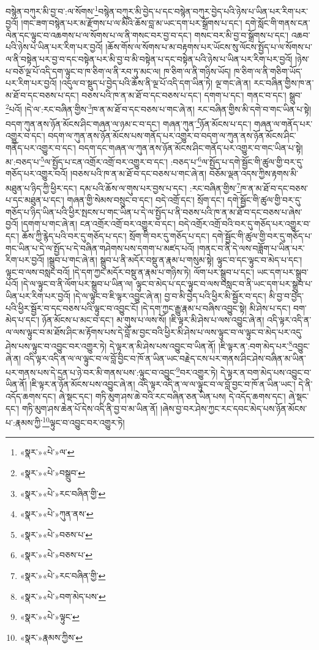 བསྙེན་བཀུར་མི་བྱ་བ་:ལ་སོགས་\footnote{«སྣར་»«པེ་»ལ་}བསྙེན་བཀུར་མི་བྱེད་པ་དང་བསྙེན་བཀུར་བྱེད་པའི་ཉེས་པ་ཡིན་པར་རིག་པར་བྱའོ། །གང་ཟག་བསྙེན་པར་མ་རྫོགས་པ་ལ་མིའི་ཆོས་བླ་མ་ཡང་དག་པར་སྒྲོགས་པ་དང་། དགེ་སློང་གི་གནས་ངན་ལེན་དང་ལྟུང་བ་འཆགས་པ་ལ་སོགས་པ་ལ་ནི་གསང་བར་བྱ་བ་དང་། གསང་བར་མི་བྱ་བ་སྒྲོགས་པ་དང་། འཆབ་པའི་ཉེས་པ་ཡིན་པར་རིག་པར་བྱའོ། །ཆོས་གོས་ལ་སོགས་པ་མ་བརྟགས་པར་ཡོངས་སུ་ལོངས་སྤྱོད་པ་ལ་སོགས་པ་ལ་ནི་བསྟེན་པར་བྱ་བ་དང་བསྟེན་པར་མི་བྱ་བ་མི་བསྟེན་པ་དང་བསྟེན་པའི་ཉེས་པ་ཡིན་པར་རིག་པར་བྱའོ། །ཉེས་པ་བཅོ་ལྔ་པོ་འདི་དག་ལྟུང་བ་ཁ་ཅིག་ལ་ནི་རབ་ཏུ་མང་ལ། ཁ་ཅིག་ལ་ནི་གཉིས་ཡོད། ཁ་ཅིག་ལ་ནི་གཅིག་ཡོད་པར་རིག་པར་བྱའོ། །འདུལ་བ་སྡུད་པ་བྱེད་པའི་ཆོས་ནི་ལྔ་པོ་འདི་དག་ཡིན་ཏེ། ལྔ་གང་ཞེ་ན། རང་བཞིན་གྱིས་ཁ་ན་མ་ཐོ་བ་དང་བཅས་པ་དང་། བཅས་པའི་ཁ་ན་མ་ཐོ་བ་དང་བཅས་པ་དང་། དགག་པ་དང་། གནང་བ་དང་། སྒྲུབ་\footnote{«སྣར་»«པེ་»བསྒྲུབ་}པའོ། །དེ་ལ་:རང་བཞིན་གྱིས་\footnote{«སྣར་»«པེ་»རང་བཞིན་གྱི་}ཁ་ན་མ་ཐོ་བ་དང་བཅས་པ་གང་ཞེ་ན། རང་བཞིན་གྱིས་མི་དགེ་བ་གང་ཡིན་པ་སྟེ། བདག་ཀུན་ནས་ཉོན་མོངས་ཤིང་གཞན་ལ་ཉམ་ང་བ་དང་། གཞན་ཀུན་\footnote{«སྣར་»«པེ་»ཀུན་ནས་}ཉོན་མོངས་པ་དང་། གཞན་ལ་གནོད་པར་འགྱུར་བ་དང་། བདག་ལ་ཀུན་ནས་ཉོན་མོངས་པས་གནོད་པར་འགྱུར་བ་བདག་ལ་ཀུན་ནས་ཉོན་མོངས་ཤིང་གནོད་པར་འགྱུར་བ་དང་། བདག་དང་གཞན་ལ་ཀུན་ནས་ཉོན་མོངས་ཤིང་གནོད་པར་འགྱུར་བ་གང་ཡིན་པ་སྟེ། མ་:བཅད་པ་\footnote{«སྣར་»«པེ་»བཅས་པ་}ལ་སྤྱོད་པ་ངན་འགྲོར་འགྲོ་བར་འགྱུར་བ་དང་། :བཅད་པ་\footnote{«སྣར་»«པེ་»བཅས་པ་}ལ་སྤྱོད་པ་དགེ་སྦྱོང་གི་ཚུལ་གྱི་བར་དུ་གཅོད་པར་འགྱུར་བའོ། །བཅས་པའི་ཁ་ན་མ་ཐོ་བ་དང་བཅས་པ་གང་ཞེ་ན། བཅོམ་ལྡན་འདས་ཀྱིས་རྟགས་མི་མཐུན་པ་ཉིད་ཀྱི་ཕྱིར་དང་། དམ་པའི་ཆོས་ལ་གུས་པར་བྱས་པ་དང་། :རང་བཞིན་གྱིས་\footnote{«སྣར་»«པེ་»རང་བཞིན་གྱི་}ཁ་ན་མ་ཐོ་བ་དང་བཅས་པ་དང་མཐུན་པ་དང་། གཞན་གྱི་སེམས་བསྲུང་བ་དང་། བདེ་འགྲོ་དང་། སྲོག་དང་། དགེ་སྦྱོང་གི་ཚུལ་གྱི་བར་དུ་གཅོད་པ་ཉིད་ཡིན་པའི་ཕྱིར་སྤངས་པ་གང་ཡིན་པ་དེ་ལ་སྤྱོད་པ་ནི་བཅས་པའི་ཁ་ན་མ་ཐོ་བ་དང་བཅས་པ་ཞེས་བྱའོ། །དགག་པ་གང་ཞེ་ན། ངན་འགྲོར་འགྲོ་བར་འགྱུར་བ་དང་། བདེ་འགྲོར་འགྲོ་བའི་བར་དུ་གཅོད་པར་འགྱུར་བ་དང་། ཆོས་ཀྱི་རྙེད་པའི་བར་དུ་གཅོད་པ་དང་། སྲོག་གི་བར་དུ་གཅོད་པ་དང་། དགེ་སྦྱོང་གི་ཚུལ་གྱི་བར་དུ་གཅོད་པ་གང་ཡིན་པ་དེ་ལ་སྤྱོད་པ་དེ་བཞིན་གཤེགས་པས་དགག་པ་མཛད་པའོ། །གནང་བ་ནི་དེ་ལས་བཟློག་པ་ཡིན་པར་རིག་པར་བྱའོ། །སྒྲུབ་པ་གང་ཞེ་ན། སྒྲུབ་པ་ནི་མདོར་བསྡུ་ན་རྣམ་པ་གསུམ་སྟེ། ལྟུང་བ་དང་ལྟུང་བ་མེད་པ་དང་། ལྟུང་བ་ལས་བསླང་བའོ། །དེ་དག་ཀྱང་མདོར་བསྡུ་ན་རྣམ་པ་གཉིས་ཏེ། ལོག་པར་སྒྲུབ་པ་དང་། ཡང་དག་པར་སྒྲུབ་པའོ། །དེ་ལ་ལྟུང་བ་ནི་ལོག་པར་སྒྲུབ་པ་ཡིན་ལ། ལྟུང་བ་མེད་པ་དང་ལྟུང་བ་ལས་བསླང་བ་ནི་ཡང་དག་པར་སྒྲུབ་པ་ཡིན་པར་རིག་པར་བྱའོ། །དེ་ལ་ལྟུང་བ་ཇི་ལྟར་འབྱུང་ཞེ་ན། བྱ་བ་མི་བྱེད་པའི་ཕྱིར་མི་སྦྱོར་བ་དང་། མི་བྱ་བ་བྱེད་པའི་ཕྱིར་སྦྱོར་བ་དང་བཅས་པའི་ལྟུང་བ་འབྱུང་ངོ། །དེ་དག་ཀྱང་རྒྱུ་རྣམ་པ་བཞིས་འབྱུང་སྟེ། མི་ཤེས་པ་དང་། བག་མེད་པ་དང་། ཉོན་མོངས་པ་མང་བ་དང་། མ་གུས་པ་ལས་སོ། །ཇི་ལྟར་མི་ཤེས་པ་ལས་འབྱུང་ཞེ་ན། འདི་ལྟར་འདི་ན་ལ་ལས་ལྟུང་བ་མ་ཐོས་ཤིང་མ་རྟོགས་པས་དེ་བློ་མ་བྱང་བའི་ཕྱིར་མི་ཤེས་པ་ལས་ལྟུང་བ་ལ་ལྟུང་བ་མེད་པར་འདུ་ཤེས་པས་ལྟུང་བ་འབྱུང་བར་འགྱུར་ཏེ། དེ་ལྟར་ན་མི་ཤེས་པས་འབྱུང་བ་ཡིན་ནོ། །ཇི་ལྟར་ན་:བག་མེད་པར་\footnote{«སྣར་»«པེ་»བག་མེད་པས་}འབྱུང་ཞེ་ན། འདི་ལྟར་འདི་ན་ལ་ལ་ལྟུང་བ་ལ་བློ་བྱིང་བ་ཁོ་ན་ཡིན་ཡང་བརྗེད་ངས་པར་གནས་ཤིང་ཤེས་བཞིན་མ་ཡིན་པར་གནས་པས་དེ་དྲན་པ་ཉེ་བར་མི་གནས་པས་:ལྟུང་བ་འབྱུང་\footnote{«སྣར་»«པེ་»ལྟུང་}བར་འགྱུར་ཏེ། དེ་ལྟར་ན་བག་མེད་པས་འབྱུང་བ་ཡིན་ནོ། །ཇི་ལྟར་ན་ཉོན་མོངས་པས་འབྱུང་ཞེ་ན། འདི་ལྟར་འདི་ན་ལ་ལ་ལྟུང་བ་ལ་བློ་བྱང་བ་ཁོ་ན་ཡིན་ཡང་། དེ་ནི་འདོད་ཆགས་དང་། ཞེ་སྡང་དང་། གཏི་མུག་ཤས་ཆེ་བའི་རང་བཞིན་ཅན་ཡིན་པས། དེ་འདོད་ཆགས་དང་། ཞེ་སྡང་དང་། གཏི་མུག་ཤས་ཆེན་པོ་དེས་འདི་ནི་བྱ་བ་མ་ཡིན་ནོ། །ཞེས་བྱ་བར་ཤེས་ཀྱང་རང་དབང་མེད་པས་ཉོན་མོངས་པ་:རྣམས་ཀྱི་\footnote{«སྣར་»རྣམས་ཀྱིས་}ལྟུང་བ་འབྱུང་བར་འགྱུར་ཏེ། 